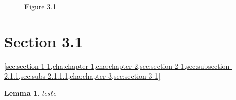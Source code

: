 \documentclass{book}
\newtheorem{lemma}{Lemma}
\begin{document}
\begin{figure}
  \centering

  \caption{Figure 3.1}
  \label{fig:figure-3-1}
\end{figure}

\section{Section 3.1}
\label{sec:section-3-1}

\cref{sec:section-1-1,cha:chapter-1,cha:chapter-2,sec:section-2-1,sec:subsection-2.1.1,sec:subs-2.1.1.1,cha:chapter-3,sec:section-3-1}



\begin{lemma}
  teste
\end{lemma}

\makeatletter
\show\@currentcounter
\makeatother

\figurename

\tablename
\end{document}

